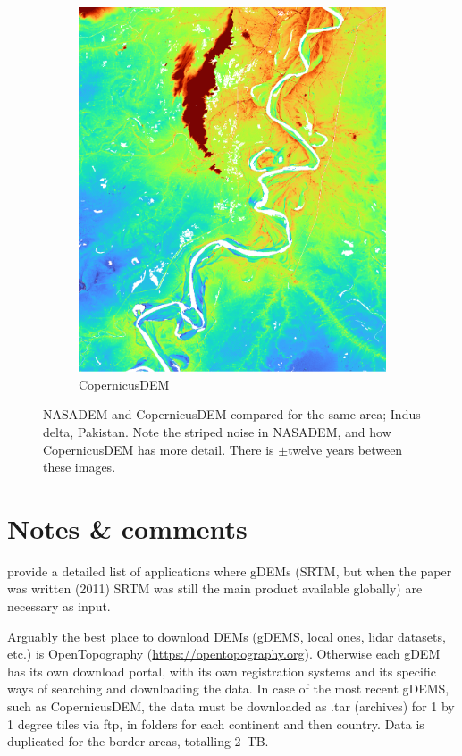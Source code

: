 \begin{figure}
\begin{subfigure}{0.45\linewidth}
    \includegraphics[width=\linewidth]{copernicusdem.png}
    \caption{CopernicusDEM}
    \label{fig:copernicusdem}
  \end{subfigure}
  \caption{NASADEM and CopernicusDEM compared for the same area; Indus delta, Pakistan.
    Note the striped noise in NASADEM, and how CopernicusDEM has more detail.
    There is $\pm$twelve years between these images.}%
  \label{fig:three graphs}
\end{figure}


%
\section{Notes \& comments}

\citet{Yang11} provide a detailed list of applications where gDEMs (SRTM, but when the paper was written (2011) SRTM was still the main product available globally) are necessary as input.

Arguably the best place to download DEMs (gDEMS, local ones, lidar datasets, etc.) is OpenTopography (\url{https://opentopography.org}).
Otherwise each gDEM has its own download portal, with its own registration systems and its specific ways of searching and downloading the data.
In case of the most recent gDEMS, such as CopernicusDEM, the data must be downloaded as .tar (archives) for 1 by 1 degree tiles via ftp, in folders for each continent and then country.
Data is duplicated for the border areas, totalling \qty{2}{TB}.

